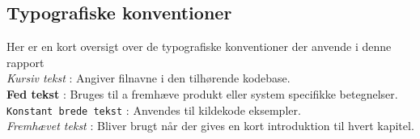 \subsection{Typografiske konventioner}
Her er en kort oversigt over de typografiske konventioner der anvende i denne rapport
\\
\textit{Kursiv tekst} : Angiver filnavne i den tilhørende kodebase.
\\
\textbf{Fed tekst} : Bruges til a fremhæve produkt eller system specifikke betegnelser.
\\
\texttt{Konstant brede tekst} : Anvendes til kildekode eksempler.
\\
\emph{Fremhævet tekst} : Bliver brugt når der gives en kort introduktion til hvert kapitel. 
\\
